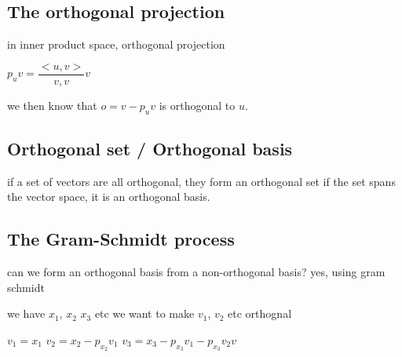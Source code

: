 
\subsection{The orthogonal projection}

in inner product space, orthogonal projection

\(p_uv = \dfrac{<u,v>}{{v,v}}v\)

we then know that \(o=v-p_uv\) is orthogonal to \(u\).


\subsection{Orthogonal set / Orthogonal basis}

if a set of vectors are all orthogonal, they form an orthogonal set
if the set spans the vector space, it is an orthogonal basis.

\subsection{The Gram-Schmidt process}

can we form an orthogonal basis from a non-orthogonal basis? yes, using gram schmidt

we have \(x_1\), \(x_2\) \(x_3\) etc
we want to make \(v_1\), \(v_2\) etc orthognal

\(v_1 = x_1\)
\(v_2 = x_2 - p_{x_2}v_1\)
\(v_3 = x_3 - p_{x_3}v_1 - p_{x_3}v_2v\)


